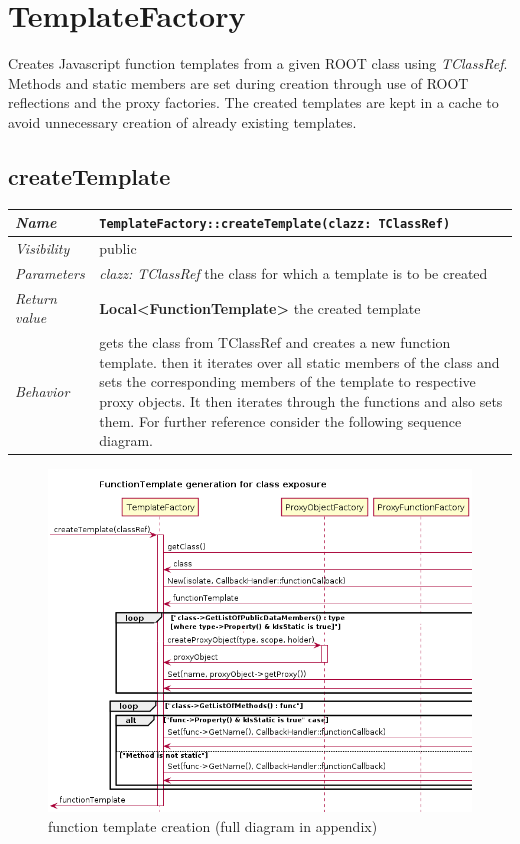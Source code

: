 \chapter{TemplateFactory}
Creates Javascript function templates from a given ROOT class using \textit{TClassRef}. Methods and static members are set during creation through use of ROOT reflections and the proxy factories. 
The created templates are kept in a cache to avoid unnecessary creation of already existing templates.
\section{createTemplate}
\begin{longtable}{p{3cm} @{\hskip 1cm} p{12cm}}
 \hline
\textit{Name} & \texttt{TemplateFactory::createTemplate(clazz: TClassRef)}\\
\hline
 \textit{Visibility} & public\\
\hline
\textit{Parameters} & \textit{clazz: TClassRef} the class for which a template is to be created \\
\hline
\textit{Return value} & \textbf{ Local<FunctionTemplate>} the created template\\
  \hline
 \textit{Behavior} & gets the class from TClassRef and creates a new function template. 
			then it iterates over all static members of the class and sets the
			corresponding members of the template to respective proxy objects.
			It then iterates through the functions and also sets them.
			For further reference consider the following sequence diagram.\\
\hline
\end{longtable} \pagebreak
 
\begin{figure}[htb]
\includegraphics[width=16cm]{./latex/resources/functionTemplateGenerateCrop.png}
	\caption{function template creation (full diagram in appendix)}
\end{figure}
